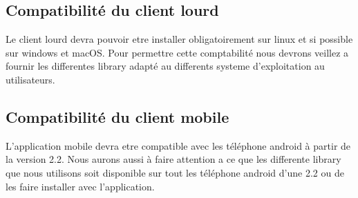 \subsection{Compatibilité du client lourd}
Le client lourd devra pouvoir etre installer obligatoirement sur linux et si possible sur windows et macOS. Pour permettre cette comptabilité nous devrons veillez a fournir les differentes library adapté au differents systeme d'exploitation au utilisateurs. 

\subsection{Compatibilité du client mobile}
L'application mobile devra etre compatible avec les téléphone android à partir de la version 2.2. Nous aurons aussi à faire attention a ce que les differente library que nous utilisons soit disponible sur tout les téléphone android d'une 2.2 ou de les faire installer avec l'application.

